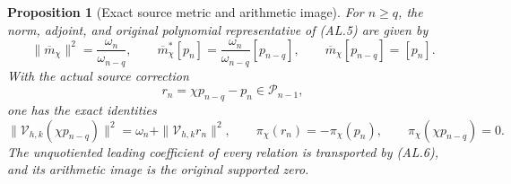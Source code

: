 \documentclass[11pt]{article}
\newtheorem{proposition}{Proposition}
\newcommand{\calP}{\mathcal P}
\begin{document}
\begin{proposition}[Exact source metric and arithmetic image]
For $n\ge q$, the norm, adjoint, and original polynomial representative of
(AL.5) are given by
\begin{equation}\tag{AL.8}
 \|\overline m_\chi\|^2=\frac{\omega_n}{\omega_{n-q}},\qquad
 \overline m_\chi^*[p_n]
 =\frac{\omega_n}{\omega_{n-q}}[p_{n-q}],\qquad
 \overline m_\chi[p_{n-q}]=[p_n].
\end{equation}
With the actual source correction
\begin{equation}\tag{AL.9}
 r_n=\chi p_{n-q}-p_n\in\calP_{n-1},
\end{equation}
one has the exact identities
\begin{equation}\tag{AL.10}
 \|\mathcal V_{h,k}(\chi p_{n-q})\|^2
   =\omega_n+\|\mathcal V_{h,k}r_n\|^2,\qquad
 \pi_\chi(r_n)=-\pi_\chi(p_n),\qquad
 \pi_\chi(\chi p_{n-q})=0.
\end{equation}
The unquotiented leading coefficient of every relation is transported by
(AL.6), and its arithmetic image is the original supported zero.
\end{proposition}
\end{document}
